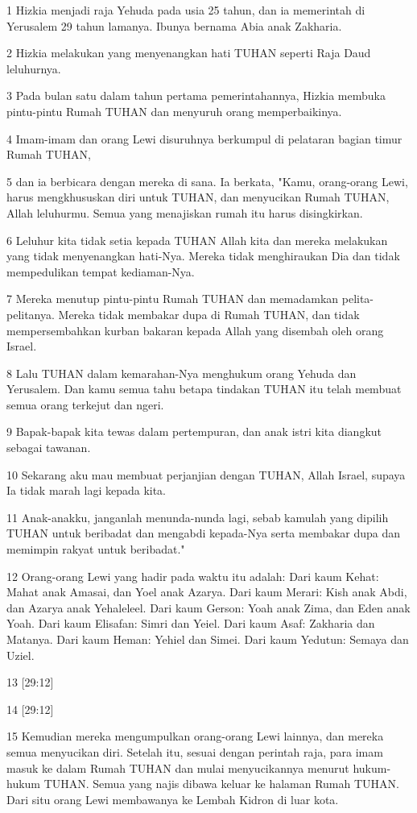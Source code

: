 \par 1 Hizkia menjadi raja Yehuda pada usia 25 tahun, dan ia memerintah di Yerusalem 29 tahun lamanya. Ibunya bernama Abia anak Zakharia.
\par 2 Hizkia melakukan yang menyenangkan hati TUHAN seperti Raja Daud leluhurnya.
\par 3 Pada bulan satu dalam tahun pertama pemerintahannya, Hizkia membuka pintu-pintu Rumah TUHAN dan menyuruh orang memperbaikinya.
\par 4 Imam-imam dan orang Lewi disuruhnya berkumpul di pelataran bagian timur Rumah TUHAN,
\par 5 dan ia berbicara dengan mereka di sana. Ia berkata, "Kamu, orang-orang Lewi, harus mengkhususkan diri untuk TUHAN, dan menyucikan Rumah TUHAN, Allah leluhurmu. Semua yang menajiskan rumah itu harus disingkirkan.
\par 6 Leluhur kita tidak setia kepada TUHAN Allah kita dan mereka melakukan yang tidak menyenangkan hati-Nya. Mereka tidak menghiraukan Dia dan tidak mempedulikan tempat kediaman-Nya.
\par 7 Mereka menutup pintu-pintu Rumah TUHAN dan memadamkan pelita-pelitanya. Mereka tidak membakar dupa di Rumah TUHAN, dan tidak mempersembahkan kurban bakaran kepada Allah yang disembah oleh orang Israel.
\par 8 Lalu TUHAN dalam kemarahan-Nya menghukum orang Yehuda dan Yerusalem. Dan kamu semua tahu betapa tindakan TUHAN itu telah membuat semua orang terkejut dan ngeri.
\par 9 Bapak-bapak kita tewas dalam pertempuran, dan anak istri kita diangkut sebagai tawanan.
\par 10 Sekarang aku mau membuat perjanjian dengan TUHAN, Allah Israel, supaya Ia tidak marah lagi kepada kita.
\par 11 Anak-anakku, janganlah menunda-nunda lagi, sebab kamulah yang dipilih TUHAN untuk beribadat dan mengabdi kepada-Nya serta membakar dupa dan memimpin rakyat untuk beribadat."
\par 12 Orang-orang Lewi yang hadir pada waktu itu adalah: Dari kaum Kehat: Mahat anak Amasai, dan Yoel anak Azarya. Dari kaum Merari: Kish anak Abdi, dan Azarya anak Yehaleleel. Dari kaum Gerson: Yoah anak Zima, dan Eden anak Yoah. Dari kaum Elisafan: Simri dan Yeiel. Dari kaum Asaf: Zakharia dan Matanya. Dari kaum Heman: Yehiel dan Simei. Dari kaum Yedutun: Semaya dan Uziel.
\par 13 [29:12]
\par 14 [29:12]
\par 15 Kemudian mereka mengumpulkan orang-orang Lewi lainnya, dan mereka semua menyucikan diri. Setelah itu, sesuai dengan perintah raja, para imam masuk ke dalam Rumah TUHAN dan mulai menyucikannya menurut hukum-hukum TUHAN. Semua yang najis dibawa keluar ke halaman Rumah TUHAN. Dari situ orang Lewi membawanya ke Lembah Kidron di luar kota.
